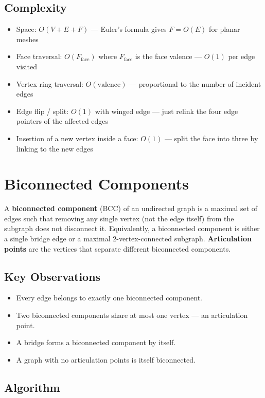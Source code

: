 \subsection{Complexity}

\begin{itemize}
\item Space: $O(V + E + F)$ — Euler's formula gives $F = O(E)$ for planar meshes
\item Face traversal: $O(F_{\text{face}})$ where $F_{\text{face}}$ is the face valence — $O(1)$ per edge visited
\item Vertex ring traversal: $O(\text{valence})$ — proportional to the number of incident edges
\item Edge flip / split: $O(1)$ with winged edge — just relink the four edge pointers of the affected edges
\item Insertion of a new vertex inside a face: $O(1)$ — split the face into three by linking to the new edges
\end{itemize}

\section{Biconnected Components}

A \textbf{biconnected component} (BCC) of an undirected graph is a maximal set of edges such that removing any single vertex (not the edge itself) from the subgraph does not disconnect it. Equivalently, a biconnected component is either a single bridge edge or a maximal 2-vertex-connected subgraph. \textbf{Articulation points} are the vertices that separate different biconnected components.

\subsection{Key Observations}

\begin{itemize}
\item Every edge belongs to exactly one biconnected component.
\item Two biconnected components share at most one vertex — an articulation point.
\item A bridge forms a biconnected component by itself.
\item A graph with no articulation points is itself biconnected.
\end{itemize}

\subsection{Algorithm}

